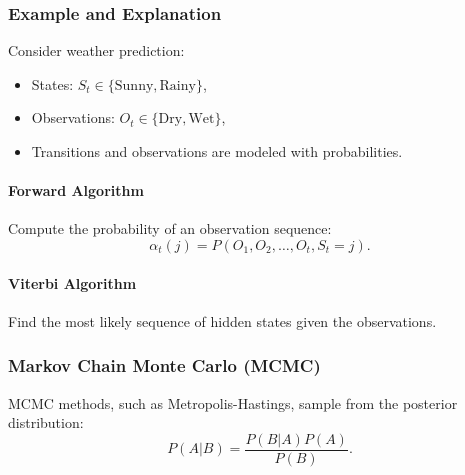 \documentclass[12pt,a4paper]{article}
\begin{document}
\subsubsection{Example and Explanation}
Consider weather prediction:
\begin{itemize}
    \item States: \( S_t \in \{\text{Sunny}, \text{Rainy}\} \),
    \item Observations: \( O_t \in \{\text{Dry}, \text{Wet}\} \),
    \item Transitions and observations are modeled with probabilities.
\end{itemize}

\paragraph{Forward Algorithm}
Compute the probability of an observation sequence:
\[
\alpha_t(j) = P(O_1, O_2, \ldots, O_t, S_t = j).
\]

\paragraph{Viterbi Algorithm}
Find the most likely sequence of hidden states given the observations.

\subsubsection{Markov Chain Monte Carlo (MCMC)}
MCMC methods, such as Metropolis-Hastings, sample from the posterior distribution:
\[
P(A|B) = \frac{P(B|A)P(A)}{P(B)}.
\]
\end{document}
